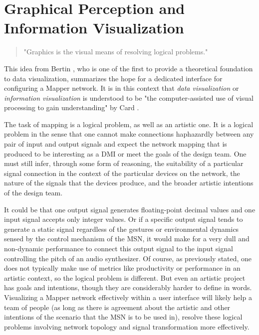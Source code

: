 \section{Graphical Perception and Information Visualization}

\begin{quote}
"Graphics is the visual means of resolving logical problems."
\end{quote}

This idea from Bertin \cite{semiology1983}, who is one of the first to provide a theoretical foundation to data visualization, summarizes the hope for a dedicated interface for configuring a Mapper network. It is in this context that \emph{data visualization} or \emph{information visualization} is understood to be "the computer-assisted use of visual processing to gain understanding" by Card \cite{card1997}. 

The task of mapping is a logical problem, as well as an artistic one. It is a logical problem in the sense that one cannot make connections haphazardly between any pair of input and output signals and expect the network mapping that is produced to be interesting as a DMI or meet the goals of the design team. One must still infer, through some form of reasoning, the suitability of a particular signal connection in the context of the particular devices on the network, the nature of the signals that the devices produce, and the broader artistic intentions of the design team. 

It could be that one output signal generates floating-point decimal values and one input signal accepts only integer values. Or if a specific output signal tends to generate a static signal regardless of the gestures or environmental dynamics sensed by the control mechanism of the MSN, it would make for a very dull and non-dynamic performance to connect this output signal to the input signal controlling the pitch of an audio synthesizer. Of course, as previously stated, one does not typically make use of metrics like productivity or performance in an artistic context, so the logical problem is different. But even an artistic project has goals and intentions, though they are considerably harder to define in words. Visualizing a Mapper network effectively within a user interface will likely help a team of people (as long as there is agreement about the artistic and other intentions of the scenario that the MSN is to be used in), resolve these logical problems involving network topology and signal transformation more effectively. 

